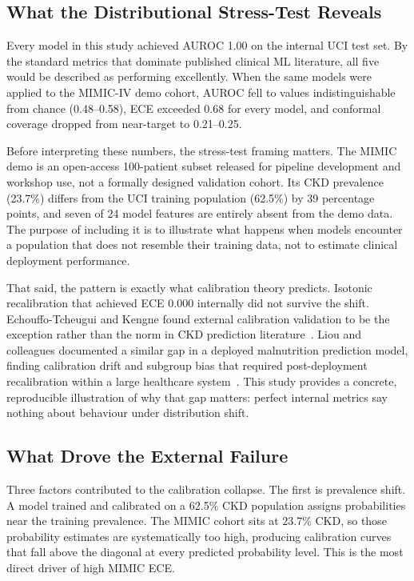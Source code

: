 \subsection{What the Distributional Stress-Test Reveals}

Every model in this study achieved AUROC 1.00 on the internal UCI test set. By the standard metrics that dominate published clinical ML literature, all five would be described as performing excellently. When the same models were applied to the MIMIC-IV demo cohort, AUROC fell to values indistinguishable from chance (0.48--0.58), ECE exceeded 0.68 for every model, and conformal coverage dropped from near-target to 0.21--0.25.

Before interpreting these numbers, the stress-test framing matters. The MIMIC demo is an open-access 100-patient subset released for pipeline development and workshop use, not a formally designed validation cohort. Its CKD prevalence (23.7\%) differs from the UCI training population (62.5\%) by 39 percentage points, and seven of 24 model features are entirely absent from the demo data. The purpose of including it is to illustrate what happens when models encounter a population that does not resemble their training data, not to estimate clinical deployment performance.

That said, the pattern is exactly what calibration theory predicts. Isotonic recalibration that achieved ECE 0.000 internally did not survive the shift. Echouffo-Tcheugui and Kengne found external calibration validation to be the exception rather than the norm in CKD prediction literature~\cite{EchouffoTcheugui2012}. Liou and colleagues documented a similar gap in a deployed malnutrition prediction model, finding calibration drift and subgroup bias that required post-deployment recalibration within a large healthcare system~\cite{Liou2024}. This study provides a concrete, reproducible illustration of why that gap matters: perfect internal metrics say nothing about behaviour under distribution shift.

\subsection{What Drove the External Failure}

Three factors contributed to the calibration collapse. The first is prevalence shift. A model trained and calibrated on a 62.5\% CKD population assigns probabilities near the training prevalence. The MIMIC cohort sits at 23.7\% CKD, so those probability estimates are systematically too high, producing calibration curves that fall above the diagonal at every predicted probability level. This is the most direct driver of high MIMIC ECE.


